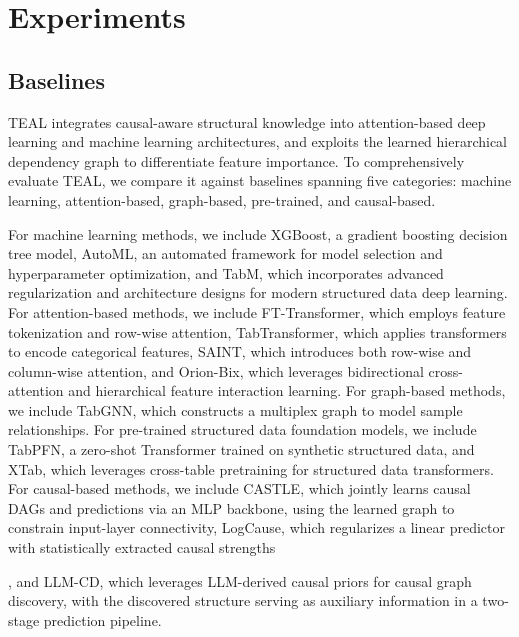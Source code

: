 \documentclass[conference]{IEEEtran}
\newcommand{\syadd}[1]{{\color{black}#1}}
\newcommand{\syfix}[1]{{\color{black}#1}}
\newcommand{\vldb}[1]{{\color{black}#1}}
\newcommand{\syic}[1]{{\color{black}#1}}
\newcommand*{\ourmodel}{TEAL}
\begin{document}
\section{Experiments}

\subsection{Baselines}
\vldb{
\syic{
\ourmodel{} integrates causal-aware structural knowledge into attention-based deep learning and machine learning architectures, and exploits the learned hierarchical dependency graph to differentiate feature importance. To comprehensively evaluate \ourmodel{}, we compare it against baselines spanning five categories: machine learning, attention-based, graph-based, pre-trained, and causal-based.}

For machine learning methods, we include XGBoost\cite{r:xgboost}, a gradient boosting decision tree model, AutoML\cite{r:automl}, an automated framework for model selection and hyperparameter optimization, \syadd{and TabM\cite{r:tabm}, which incorporates advanced regularization and architecture designs for modern structured data deep learning.} For attention-based methods, we include FT-Transformer\cite{r:ft-transformer}, which employs feature tokenization and row-wise attention, TabTransformer\cite{r:tab}, which applies transformers to encode categorical features, SAINT\cite{r:SAINT}, which introduces both row-wise and column-wise attention, \syadd{and Orion-Bix\cite{r:orionbix}, which leverages bidirectional cross-attention and hierarchical feature interaction learning.} For graph-based methods, we include TabGNN\cite{r:gnnbased}, which constructs a multiplex graph to model sample relationships. \syic{For pre-trained structured data foundation models, we include TabPFN\cite{r:tabpfn}, a zero-shot Transformer trained on synthetic structured data, and XTab\cite{r:xtab}, which leverages cross-table pretraining for structured data transformers.} For causal-based methods, we include CASTLE\cite{r:CASTLE}, which jointly learns causal DAGs and predictions via an MLP backbone, \syic{using the learned graph to constrain input-layer connectivity}, LogCause\cite{r:linear}, which regularizes a linear predictor with statistically extracted causal strengths}\syfix{, and LLM-CD\cite{r:llmcd}, which leverages LLM-derived causal priors for causal graph discovery, \syic{with the discovered structure serving as auxiliary information in a two-stage prediction pipeline.}}
\end{document}
